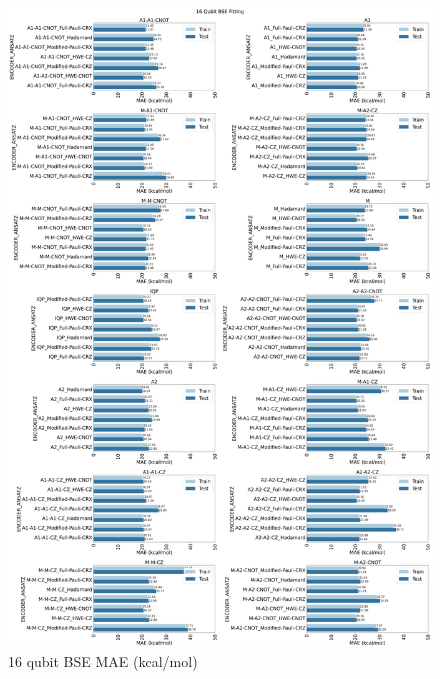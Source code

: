 \documentclass[journal=jacsat,manuscript=article]{achemso}
\begin{document}
\begin{figure}[H]
	\centering
	\includegraphics[width=\textwidth]{images/BSE/16qubit_BSE_MAE.png}
	\caption{16 qubit BSE MAE (kcal/mol)}
	\label{fig:16qubit_BSE_MAE}
\end{figure}
\end{document}
